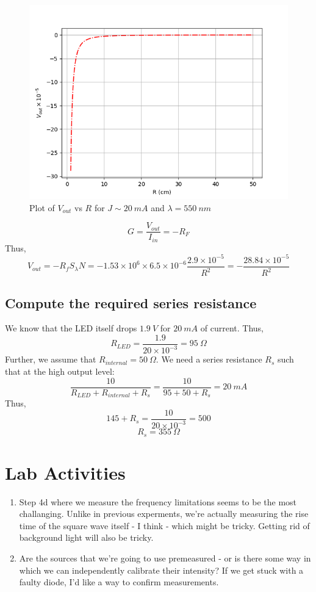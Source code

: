 \documentclass[english]{article}
\begin{document}
\begin{figure}
\begin{centering}
\includegraphics[scale=0.5]{plots/VoutvR}
\par\end{centering}
\caption{Plot of $V_{out}$ vs $R$ for $J\sim20\ mA$ and $\lambda=550\ nm$}
\end{figure}

\[
G=\frac{V_{out}}{I_{in}}=-R_{F}
\]
Thus,
\[
V_{out}=-R_{f}S_{\lambda}N=-1.53\times10^{6}\times6.5\times10^{-6}\frac{2.9\times10^{-5}}{R^{2}}=-\frac{28.84\times10^{-5}}{R^{2}}
\]

\subsection{Compute the required series resistance}

We know that the LED itself drops $1.9\ V$ for $20\ mA$ of current.
Thus,
\[
R_{LED}=\frac{1.9}{20\times10^{-3}}=95\ \Omega
\]
Further, we assume that $R_{internal}=50\ \Omega$. We need a series
resistance $R_{s}$ such that at the high output level:
\[
\frac{10}{R_{LED}+R_{internal}+R_{s}}=\frac{10}{95+50+R_{s}}=20\ mA
\]
Thus,
\[
145+R_{s}=\frac{10}{20\times10^{-3}}=500
\]
\[
R_{s}=355\ \Omega
\]

\section{Lab Activities}
\begin{enumerate}
\item Step 4d where we measure the frequency limitations seems to be the
most challanging. Unlike in previous experments, we're actually measuring
the rise time of the square wave itself - I think - which might be
tricky. Getting rid of background light will also be tricky.
\item Are the sources that we're going to use premeasured - or is there
some way in which we can independently calibrate their intensity?
If we get stuck with a faulty diode, I'd like a way to confirm measurements.
\end{enumerate}
\end{document}
